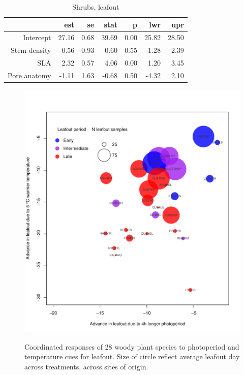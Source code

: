 \documentclass{article}
\begin{document}
\begin{table}[ht]
\centering
\caption{Shrubs, leafout} 
\begin{tabular}{rrrrrrr}
  \hline
 & est & se & stat & p & lwr & upr \\ 
  \hline
Intercept & 27.16 & 0.68 & 39.69 & 0.00 & 25.82 & 28.50 \\ 
  Stem density & 0.56 & 0.93 & 0.60 & 0.55 & -1.28 & 2.39 \\ 
  SLA & 2.32 & 0.57 & 4.06 & 0.00 & 1.20 & 3.45 \\ 
  Pore anatomy & -1.11 & 1.63 & -0.68 & 0.50 & -4.32 & 2.10 \\ 
   \hline
\end{tabular}
\end{table}

\begin{figure} %
\begin{center}
\caption{Coordinated responses of 28 woody plant species to photoperiod and temperature cues for leafout. Size of circle reflect average leafout day across treatments, across sites of origin.}
\includegraphics[scale=0.5]{Advplot2}
\label{fig1}
\end{center}
\end{figure}
\end{document}
